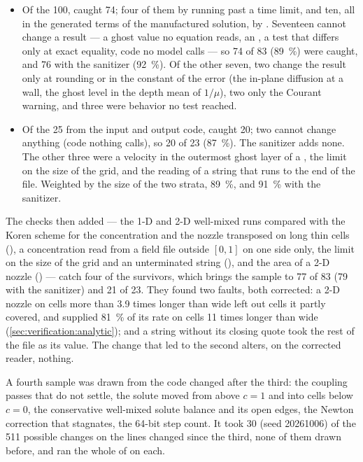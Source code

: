 \begin{itemize}
  \item Of the 100,  caught 74; four of them by running past a
    time limit, and ten, all in the generated terms of the manufactured
    solution, by . Seventeen cannot change a
    result --- a ghost value no equation reads, an , a test that
    differs only at exact equality, code no model calls --- so 74 of 83
    (\SI{89}{\percent}) were caught, and 76 with the sanitizer
    (\SI{92}{\percent}). Of the other seven, two change the result only at
    rounding or in the constant of the error (the in-plane diffusion at a
     wall, the ghost level in the depth mean of $1/\mu$), two only
    the Courant warning, and three were behavior no test reached.
  \item Of the 25 from the input and output code,  caught 20;
    two cannot change anything (code nothing calls), so 20 of 23
    (\SI{87}{\percent}). The sanitizer adds none. The other three were a
    velocity in the outermost ghost layer of a  , the
    limit on the size of the grid, and the reading of a  string
    that runs to the end of the file. Weighted by the size of
    the two strata, \SI{89}{\percent}, and \SI{91}{\percent} with the
    sanitizer.
\end{itemize}

The checks then added --- the 1-D and 2-D well-mixed runs compared with the
Koren scheme for the concentration and the nozzle transposed on long thin
cells (), a concentration read from a field file outside
$[0, 1]$ on one side only, the limit on the size of the grid and an
unterminated  string (), and the area of a 2-D
nozzle () --- catch four of the survivors, which brings the
sample to 77 of 83 (79 with the sanitizer) and 21 of 23. They found two
faults, both corrected: a 2-D nozzle on cells more than 3.9 times longer than
wide left out cells it partly covered, and supplied \SI{81}{\percent} of its
rate on cells 11 times longer than wide
(\cref{sec:verification:analytic}); and a  string without its
closing quote took the rest of the file as its value. The change that led to
the second alters, on the corrected reader, nothing.

A fourth sample was drawn from the code changed after the third: the
 coupling passes that do not settle, the solute moved from above
$c = 1$ and into cells below $c = 0$, the conservative well-mixed solute
balance and its open edges, the Newton correction that stagnates, the 64-bit
step count. It took 30 (seed 20261006) of the 511 possible changes on the
lines changed since the third, none of them drawn before, and ran the whole
of  on each.

